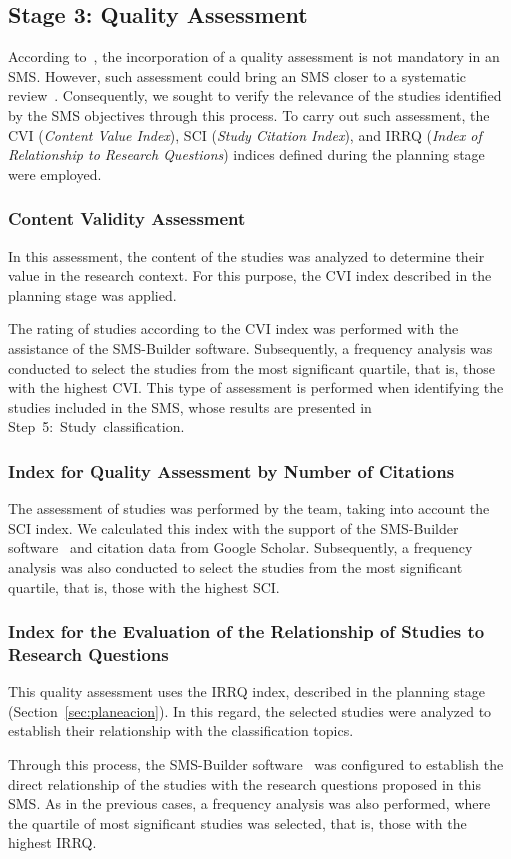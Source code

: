 \subsection{Stage 3: Quality Assessment}
According to~\cite{Ali-01}, the incorporation of a quality assessment is not mandatory in an SMS. However, such assessment could bring an SMS closer to a systematic review~\cite{Petersen-01}. Consequently, we sought to verify the relevance of the studies identified by the SMS objectives through this process. To carry out such assessment, the CVI (\textit{Content Value Index}), SCI (\textit{Study Citation Index}), and IRRQ (\textit{Index of Relationship to Research Questions}) indices defined during the planning stage were employed.

\subsubsection{Content Validity Assessment}
In this assessment, the content of the studies was analyzed to determine their value in the research context. For this purpose, the CVI index described in the planning stage was applied.

The rating of studies according to the CVI index was performed with the assistance of the SMS-Builder software. Subsequently, a frequency analysis was conducted to select the studies from the most significant quartile, that is, those with the highest CVI. This type of assessment is performed when identifying the \totalEtapaDos{} studies included in the SMS, whose results are presented in \hbox{Step 5: Study classification.}

\subsubsection{Index for Quality Assessment by Number of Citations}
The assessment of studies was performed by the team, taking into account the SCI index. We calculated this index with the support of the SMS-Builder software~\cite{sms-builder-repo} and citation data from Google Scholar. Subsequently, a frequency analysis was also conducted to select the studies from the most significant quartile, that is, those with the highest SCI.

\subsubsection{Index for the Evaluation of the Relationship of Studies to Research Questions}
This quality assessment uses the IRRQ index, described in the planning stage (Section~\ref{sec:planeacion}). In this regard, the selected studies were analyzed to establish their relationship with the classification topics.

Through this process, the SMS-Builder software~\cite{sms-builder-repo} was configured to establish the direct relationship of the studies with the research questions proposed in this SMS. As in the previous cases, a frequency analysis was also performed, where the quartile of most significant studies was selected, that is, those with the highest IRRQ.
